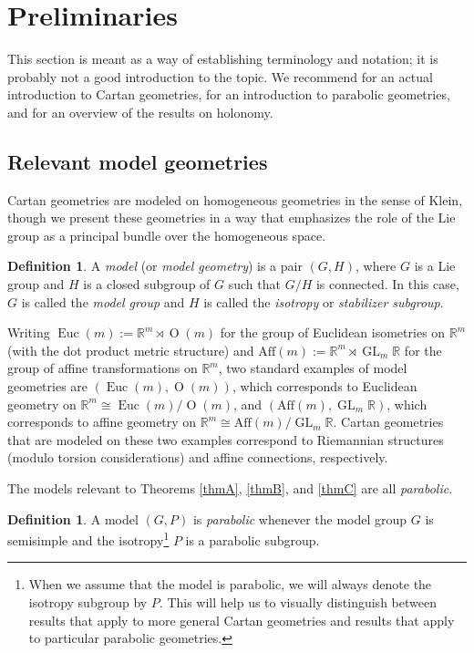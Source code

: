 \documentclass[10pt,a4paper]{amsart}
\numberwithin{equation}{section}
\theoremstyle{definition}
\newtheorem{Definition}[Theorem]{Definition}
\DeclareMathOperator{\Iso}{\mathrm{Euc}}
\DeclareMathOperator{\Orth}{\mathrm{O}}
\DeclareMathOperator{\GLin}{\mathrm{GL}}
\begin{document}
\section{Preliminaries}\label{preliminaries}
This section is meant as a way of establishing terminology and notation; it is probably not a good introduction to the topic. We recommend \cite{Sharpe1997} for an actual introduction to Cartan geometries, \cite{CapSlovakPG1} for an introduction to parabolic geometries, and \cite{HolonomyPaper} for an overview of the results on holonomy.

\subsection{Relevant model geometries}
Cartan geometries are modeled on homogeneous geometries in the sense of Klein, though we present these geometries in a way that emphasizes the role of the Lie group as a principal bundle over the homogeneous space.

\begin{Definition}A \emph{model} (or \emph{model geometry}) is a pair $(G,H)$, where $G$ is a Lie group and $H$ is a closed subgroup of $G$ such that $G/H$ is connected. In this case, $G$ is called the \emph{model group} and $H$ is called the \emph{isotropy} or \emph{stabilizer subgroup}.\end{Definition}

Writing $\Iso(m):=\mathbb{R}^m\rtimes\Orth(m)$ for the group of Euclidean isometries on $\mathbb{R}^m$ (with the dot product metric structure) and $\mathrm{Aff}(m):=\mathbb{R}^m\rtimes\GLin_m\mathbb{R}$ for the group of affine transformations on $\mathbb{R}^m$, two standard examples of model geometries are $(\Iso(m),\Orth(m))$, which corresponds to Euclidean geometry on $\mathbb{R}^m\cong\Iso(m)/\Orth(m)$, and $(\mathrm{Aff}(m),\GLin_m\mathbb{R})$, which corresponds to affine geometry on $\mathbb{R}^m\cong\mathrm{Aff}(m)/\GLin_m\mathbb{R}$. Cartan geometries that are modeled on these two examples correspond to Riemannian structures (modulo torsion considerations) and affine connections, respectively.

The models relevant to Theorems \ref{thmA}, \ref{thmB}, and \ref{thmC} are all \emph{parabolic}.

\begin{Definition}A model $(G,P)$ is \emph{parabolic} whenever the model group $G$ is semisimple and the isotropy\footnote{When we assume that the model is parabolic, we will always denote the isotropy subgroup by $P$. This will help us to visually distinguish between results that apply to more general Cartan geometries and results that apply to particular parabolic geometries.} $P$ is a parabolic subgroup.\end{Definition}
\end{document}
